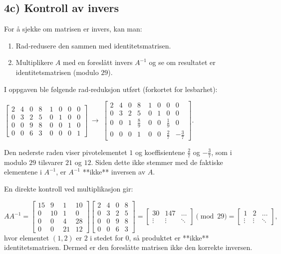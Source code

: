 \documentclass[12pt,a4paper]{article}
\begin{document}
\subsection{4c) Kontroll av invers}
For å sjekke om matrisen er invers, kan man:

\begin{enumerate}
\item Rad‑redusere den sammen med identitetsmatrisen.
\item Multiplikere $A$ med en foreslått invers $A^{-1}$ og se om resultatet er
      identitetsmatrisen (modulo $29$).
\end{enumerate}

I oppgaven ble følgende rad‑reduksjon utført (forkortet for lesbarhet):

$
\begin{bmatrix}
2&4&0&8&\;1&0&0&0\\
0&3&2&5&\;0&1&0&0\\
0&0&9&8&\;0&0&1&0\\
0&0&6&3&\;0&0&0&1
\end{bmatrix}
\;\longrightarrow\;
\begin{bmatrix}
2&4&0&8&\;1&0&0&0\\
0&3&2&5&\;0&1&0&0\\
0&0&1&\tfrac{8}{9}&\;0&0&\tfrac{1}{9}&0\\
0&0&0&1&\;0&0&\tfrac{2}{7}&-\tfrac{3}{7}
\end{bmatrix}.
$

Den nederste raden viser pivotelementet $1$ og koeffisientene
$\frac{2}{7}$ og $-\frac{3}{7}$, som i modulo $29$ tilsvarer $21$ og $12$.
Siden dette ikke stemmer med de faktiske elementene i $A^{-1}$, er
$A^{-1}$ **ikke** inversen av $A$.

En direkte kontroll ved multiplikasjon gir:

$
AA^{-1}=
\begin{bmatrix}
15&9&1&10\\
0&10&1&0\\
0&0&4&28\\
0&0&21&12
\end{bmatrix}
\begin{bmatrix}
2&4&0&8\\
0&3&2&5\\
0&0&9&8\\
0&0&6&3
\end{bmatrix}
=
\begin{bmatrix}
30&147&\dots\\
\vdots & \vdots & \ddots
\end{bmatrix}
\pmod{29}
=
\begin{bmatrix}
1&2&\dots\\
\vdots&\vdots&\ddots
\end{bmatrix},
$
hvor elementet $(1,2)$ er $2$ i stedet for $0$, så produktet er **ikke**
identitetsmatrisen. Dermed er den foreslåtte matrisen ikke den korrekte
inversen.
\end{document}
